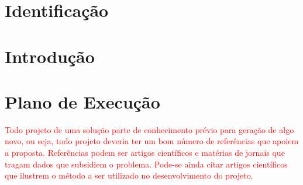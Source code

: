 \documentclass[12pt]{article}
\date{\today}
\begin{document}
\maketitle

\tableofcontents
\newpage

\section{Identificação}
\label{sec:ident}


\newpage
\section{Introdução}
\label{sec:intro}


\newpage
\section{Plano de Execução}
\label{sec:plano}

\newpage

\textcolor{red}{Todo projeto de uma solução parte de conhecimento prévio para geração de algo novo, ou seja, todo projeto deveria ter um bom número de referências que apoiem a proposta. Referências podem ser artigos científicos e matérias de jornais que tragam dados que subsidiem o problema. Pode-se ainda citar artigos científicos que ilustrem o método a ser utilizado no desenvolvimento do projeto.}
\printbibliography
\end{document}

